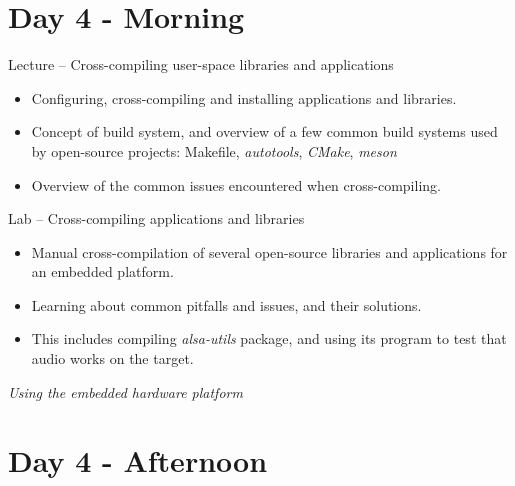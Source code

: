 \documentclass[a4paper,12pt,obeyspaces,spaces,hyphens]{article}
\begin{document}
\section{Day 4 - Morning}

\feagendatwocolumn
{Lecture – Cross-compiling user-space libraries and applications}
{
  \begin{itemize}
  \item Configuring, cross-compiling and installing applications and
    libraries.
  \item Concept of build system, and overview of a few common build
    systems used by open-source projects: Makefile, {\em autotools},
    {\em CMake}, {\em meson}
  \item Overview of the common issues encountered when
    cross-compiling.
  \end{itemize}
}
{Lab – Cross-compiling applications and libraries}
{
  \begin{itemize}
  \item Manual cross-compilation of several open-source libraries and
    applications for an embedded platform.
  \item Learning about common pitfalls and issues, and their
    solutions.
  \item This includes compiling {\em alsa-utils} package,
    and using its  program to test that
    audio works on the target.
  \end{itemize}

  \vspace{0.5cm}
  {\em Using the embedded hardware platform}
}

\section{Day 4 - Afternoon}
\end{document}
